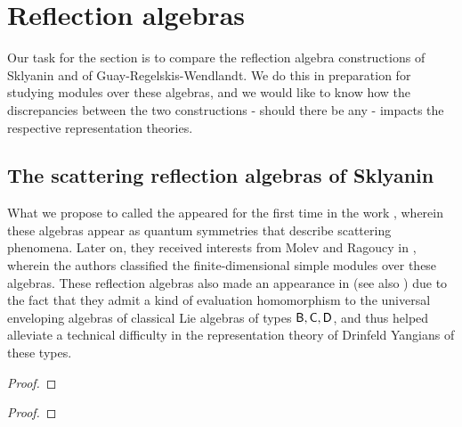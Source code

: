 \section{Reflection algebras}
    Our task for the section is to compare the reflection algebra constructions of Sklyanin and of Guay-Regelskis-Wendlandt. We do this in preparation for studying modules over these algebras, and we would like to know how the discrepancies between the two constructions - should there be any - impacts the respective representation theories.

    \subsection{The scattering reflection algebras of Sklyanin}
        What we propose to called the   appeared for the first time in the work \cite{sklyanin_boundary_conditions_for_integrable_quantum_systems}, wherein these algebras appear as quantum symmetries that describe scattering phenomena. Later on, they received interests from Molev and Ragoucy in \cite{molev_ragoucy_representations_of_reflection_algebras}, wherein the authors classified the finite-dimensional simple modules over these algebras. These reflection algebras also made an appearance in \cite{isaev_molev_ogievetsky_fusion_for_brauer_algebras_2} (see also \cite{isaev_molev_fusion_for_brauer_algebras_1}) due to the fact that they admit a kind of evaluation homomorphism to the universal enveloping algebras of classical Lie algebras of types $\mathsf{B}, \mathsf{C}, \mathsf{D}$, and thus helped alleviate a technical difficulty in the representation theory of Drinfeld Yangians of these types.

        \begin{definition} \label{def: scatteering_reflection_algebras}
            
        \end{definition}

        \begin{lemma} \label{lemma: embedding_scattering_reflection_algebras_into_extended_yangians}
            
        \end{lemma}
            \begin{proof}
                
            \end{proof}
        \begin{theorem} \label{theorem: evaluation_homomorphism_for_scattering_reflection_algebras}
            
        \end{theorem}
            \begin{proof}
                
            \end{proof}

